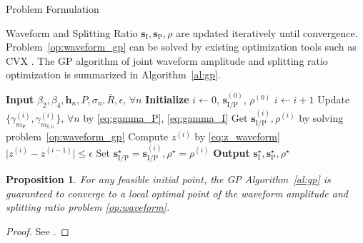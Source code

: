 \documentclass[journal]{IEEEtran}
\newtheorem{proposition}{Proposition}
\begin{document}
\begin{section}{Problem Formulation}
\begin{subsection}{Waveform and Splitting Ratio}
			$\boldsymbol{s}_{\mathrm{I}},\boldsymbol{s}_\mathrm{P},\rho$ are updated iteratively until convergence. Problem~\eqref{op:waveform_gp} can be solved by existing optimization tools such as CVX \cite{Grant2013}. The GP algorithm of joint waveform amplitude and splitting ratio optimization is summarized in Algorithm~\ref{al:gp}.
			\begin{algorithm}[!t]
				\caption{GP: Waveform Amplitude and Splitting Ratio.}
				\label{al:gp}
				\begin{algorithmic}[1]
					\State \textbf{Input} $\beta_2,\beta_4,\boldsymbol{h}_n,P,\sigma_n,\bar{R},\epsilon$, $\forall n$
					\State \textbf{Initialize} $i \gets 0$, $\boldsymbol{s}_{\mathrm{I/P}}^{(0)}$, $\rho^{(0)}$
					\Repeat
						\State $i \gets i + 1$
						\State Update $\{\gamma_{m_\mathrm{P}}^{(i)},\gamma_{m_{\mathrm{I},n}}^{(i)}\}$, $\forall n$ by \eqref{eq:gamma_P}, \eqref{eq:gamma_I}
						\State Get $\boldsymbol{s}_{\mathrm{I/P}}^{(i)},\rho^{(i)}$ by solving problem~\eqref{op:waveform_gp}
						\State Compute $z^{(i)}$ by \eqref{eq:z_waveform}
					\Until $\lvert z^{(i)} - z^{(i-1)} \rvert \le \epsilon$
					\State Set $\boldsymbol{s}_{\mathrm{I/P}}^{\star}=\boldsymbol{s}_{\mathrm{I/P}}^{(i)},\rho^{\star}=\rho^{(i)}$
					\State \textbf{Output} $\boldsymbol{s}_{\mathrm{I}}^{\star},\boldsymbol{s}_{\mathrm{P}}^{\star},\rho^{\star}$
				\end{algorithmic}
			\end{algorithm}

			\begin{proposition}\label{pr:gp}
				For any feasible initial point, the GP Algorithm~\ref{al:gp} is guaranteed to converge to a local optimal point of the waveform amplitude and splitting ratio problem \eqref{op:waveform}.
			\end{proposition}

			\begin{proof}\label{pf:gp}
				See \cite{Clerckx2016a,Clerckx2018b}.
			\end{proof}
		\end{subsection}



\end{section}
\end{document}
